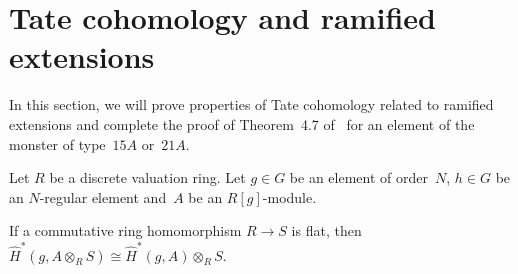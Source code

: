 \section{Tate cohomology and ramified extensions}\label{section4}

In this section, we will prove properties of Tate cohomology related to ramified extensions and complete the proof of Theorem~4.7 of~\cite{BR} for an element of the monster of type~$15A $ or~$21A$.

Let $R$ be a discrete valuation ring. Let $g \in G$ be an element of order~$N$, $h \in G$ be an $N$-regular element and~$A$ be an $R[g]$-module.

\begin{Proposition}\label{tensor}
If a commutative ring homomorphism $R \rightarrow S$ is flat, then $\hat{H}^*(g,A\otimes_{R}S)\cong \hat{H}^*(g,A)\otimes_{R}S$.
\end{Proposition}

